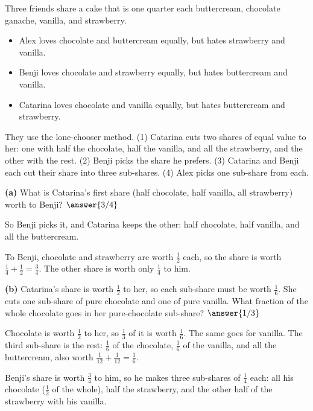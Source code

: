 \documentclass[12pt]{ximera}
\begin{document}
\begin{problem}
Three friends share a cake that is one quarter each buttercream, chocolate ganache,
vanilla, and strawberry.
\begin{itemize}
\item Alex loves chocolate and buttercream equally, but hates strawberry and vanilla.
\item Benji loves chocolate and strawberry equally, but hates buttercream and vanilla.
\item Catarina loves chocolate and vanilla equally, but hates buttercream and strawberry.
\end{itemize}
They use the lone-chooser method. (1) Catarina cuts two shares of equal value to her: one
with half the chocolate, half the vanilla, and all the strawberry, and the other with the
rest. (2) Benji picks the share he prefers. (3) Catarina and Benji each cut their share
into three sub-shares. (4) Alex picks one sub-share from each.

\begin{prompt}
\textbf{(a)} What is Catarina's first share (half chocolate, half vanilla, all strawberry)
worth to Benji? $\answer{3/4}$

\smallskip
So Benji picks it, and Catarina keeps the other: half chocolate, half vanilla, and all
the buttercream.
\begin{feedback}
To Benji, chocolate and strawberry are worth $\frac12$ each, so the share is worth
$\frac14+\frac12=\frac34$. The other share is worth only $\frac14$ to him.
\end{feedback}
\end{prompt}

\begin{prompt}
\textbf{(b)} Catarina's share is worth $\frac12$ to her, so each sub-share must be worth
$\frac16$. She cuts one sub-share of pure chocolate and one of pure vanilla. What
fraction of the whole chocolate goes in her pure-chocolate sub-share? $\answer{1/3}$
\begin{feedback}
Chocolate is worth $\frac12$ to her, so $\frac13$ of it is worth $\frac16$. The same goes
for vanilla. The third sub-share is the rest: $\frac16$ of the chocolate, $\frac16$ of
the vanilla, and all the buttercream, also worth $\frac1{12}+\frac1{12}=\frac16$.

Benji's share is worth $\frac34$ to him, so he makes three sub-shares of $\frac14$ each:
all his chocolate ($\frac12$ of the whole), half the strawberry, and the other half of
the strawberry with his vanilla.
\end{feedback}
\end{prompt}


\end{problem}
\end{document}
